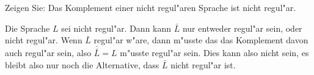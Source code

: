 Zeigen Sie: Das Komplement einer nicht regul"aren Sprache ist nicht
regul"ar.

\begin{loesung}
Die Sprache $L$ sei nicht regul"ar. Dann kann $\bar L$ nur
entweder regul"ar sein, oder nicht regul"ar. Wenn $\bar L$
regul"ar w"are, dann m"usste das das Komplement davon
auch regul"ar sein, also $\bar{\bar L}=L$ m"usste regul"ar sein.
Dies kann also nicht sein, es bleibt also nur noch die Alternative,
dass $\bar L$ nicht regul"ar ist.
\end{loesung}
